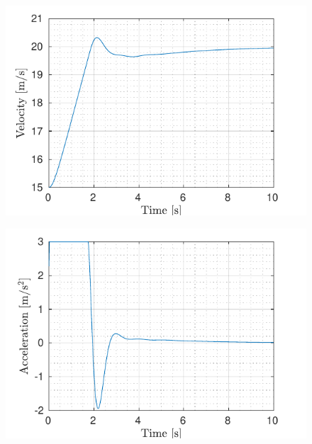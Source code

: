 \begin{figure}[!h]
	\centering
	\begin{minipage}[t]{0.49\textwidth}
		\includegraphics[width=\textwidth]{../../MATLAB/lane_following_curve/figure/LongitudinalVelocityVsTime_curve.pdf}
		\label{fig:longitudinal_velocity_laneFollowing_curve}
	\end{minipage}
	\begin{minipage}[t]{0.49\textwidth}
		\includegraphics[width=\textwidth]{../../MATLAB/lane_following_curve/figure/AccelerationVsTime_curve.pdf}
		\label{fig:acceleration_laneFollowing_curve}
	\end{minipage}
	\begin{minipage}[t]{0.49\textwidth}

\end{minipage}
\end{figure}
